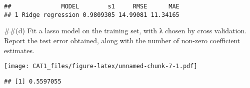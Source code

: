 \documentclass[
]{article}
\newenvironment{Shaded}{\begin{snugshade}}{\end{snugshade}}
\newcommand{\AttributeTok}[1]{\textcolor[rgb]{0.77,0.63,0.00}{#1}}
\newcommand{\CommentTok}[1]{\textcolor[rgb]{0.56,0.35,0.01}{\textit{#1}}}
\newcommand{\DecValTok}[1]{\textcolor[rgb]{0.00,0.00,0.81}{#1}}
\newcommand{\FunctionTok}[1]{\textcolor[rgb]{0.00,0.00,0.00}{#1}}
\newcommand{\NormalTok}[1]{#1}
\newcommand{\OtherTok}[1]{\textcolor[rgb]{0.56,0.35,0.01}{#1}}
\newcommand{\SpecialCharTok}[1]{\textcolor[rgb]{0.00,0.00,0.00}{#1}}
\begin{document}
\begin{verbatim}
##              MODEL        s1     RMSE      MAE
## 1 Ridge regression 0.9809305 14.99081 11.34165
\end{verbatim}

\#\#(d) Fit a lasso model on the training set, with λ chosen by cross
validation. Report the test error obtained, along with the number of
non-zero coefficient estimates.

\begin{Shaded}
\end{Shaded}

\texttt{[image: CAT1\_files/figure-latex/unnamed-chunk-7-1.pdf]}

\begin{Shaded}
\end{Shaded}

\begin{verbatim}
## [1] 0.5597055
\end{verbatim}
\end{document}
